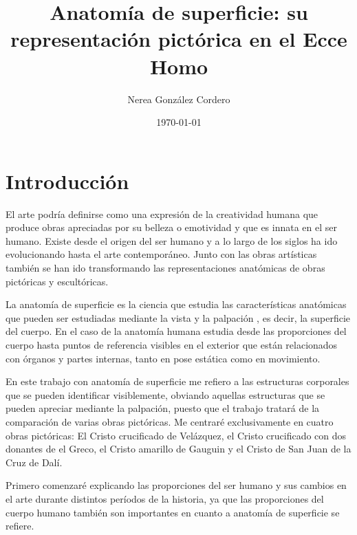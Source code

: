 \documentclass[a4paper,12pt]{article} %
\begin{document}
\title{Anatomía de superficie: su representación pictórica en el Ecce Homo}
\author{Nerea González Cordero}
\date{\today}
\maketitle %
\thispagestyle{empty} %
\newpage %

\tableofcontents %
\thispagestyle{empty}
\newpage
{} %

\section{Introducción} %
El arte podría definirse como una expresión de la creatividad humana que produce obras apreciadas por su belleza o emotividad y que es innata en el ser humano. Existe desde el origen del ser humano y  %
a lo largo de los siglos ha ido evolucionando hasta el arte contemporáneo. Junto con las obras artísticas también se han ido transformando las representaciones anatómicas de obras pictóricas y escultóricas.

La anatomía de superficie es la ciencia que estudia las características anatómicas que pueden ser estudiadas mediante la vista y la palpación%
, es decir, la superficie del cuerpo. En el caso de la anatomía humana estudia desde las proporciones del cuerpo hasta puntos de referencia visibles en el exterior que están relacionados con órganos y partes internas, tanto en pose estática como en movimiento. %

En este trabajo con anatomía de superficie me refiero a las estructuras corporales que se pueden identificar visiblemente, obviando aquellas estructuras que se pueden apreciar mediante la palpación, puesto que el trabajo tratará de la comparación de varias obras pictóricas. Me centraré exclusivamente en cuatro obras pictóricas: El Cristo crucificado de Velázquez, el Cristo crucificado con dos donantes de el Greco, el Cristo amarillo de Gauguin y el Cristo de San Juan de la Cruz de Dalí.

Primero comenzaré explicando las proporciones del ser humano y sus cambios en el arte durante distintos períodos de la historia, ya que las proporciones del cuerpo humano también son importantes en cuanto a anatomía de superficie se refiere.
\end{document}
